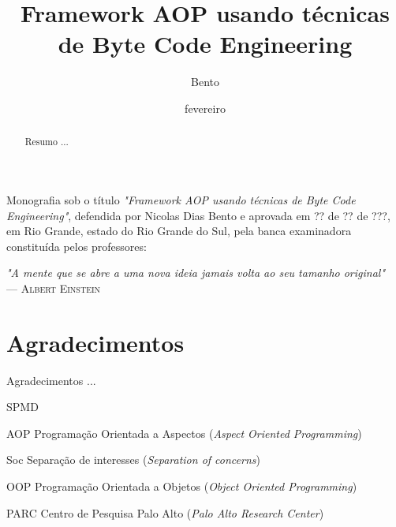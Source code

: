 \documentclass[tc,openright]{iiufrgs}
\title{Framework AOP usando técnicas de Byte Code Engineering}
\author{Bento}{Nicolas}
\date{fevereiro}{2014}
\begin{document}
\maketitle

\begin{folhadeaprovacao}
Monografia sob o título \textit{"Framework AOP usando técnicas de Byte Code Engineering"}, defendida por Nicolas Dias Bento e aprovada em ?? de ?? de ???, em Rio Grande, estado do Rio Grande do Sul, pela banca examinadora constituída pelos professores:
\end{folhadeaprovacao}

\clearpage

\begin{flushright}
\mbox{}\vfill
{\sffamily\itshape
"A mente que se abre a uma nova ideia jamais volta ao seu tamanho original"\\}
--- \textsc{Albert Einstein}
\end{flushright}

\chapter*{Agradecimentos}

Agradecimentos ...

\tableofcontents

\begin{listofabbrv}{SPMD}
	\item[AOP] Programação Orientada a Aspectos (\textit{Aspect Oriented Programming})
	\item[Soc] Separação de interesses (\textit{Separation of concerns})
	\item[OOP] Programação Orientada a Objetos (\textit{Object Oriented Programming})
	\item[PARC] Centro de Pesquisa Palo Alto (\textit{Palo Alto Research Center})
\end{listofabbrv}

\listoffigures

\listoftables

\begin{abstract}

Resumo ...

\end{abstract}
\end{document}
